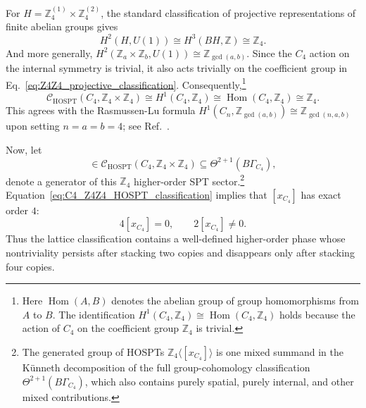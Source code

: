 \documentclass[aps,prx,reprint,superscriptaddress,twocolumn,amsmath,amssymb,amsfonts, nofootinbib]{revtex4-2}
\newcommand{\Z}{\mathbb{Z}}
\theoremstyle{apsstyle}
\begin{document}
\bigskip 

For $H=\mathbb Z_4^{(1)}\times\mathbb Z_4^{(2)}$, the standard classification of projective representations of finite abelian groups gives 
\begin{equation} 
H^{2}(H,U(1)) \cong H^{3}(BH,\mathbb Z) \cong \mathbb Z_4. \label{eq:Z4Z4_projective_classification} \end{equation} 
And more generally, $H^{2}(\mathbb Z_a\times\mathbb Z_b,U(1)) \cong\mathbb Z_{\gcd(a,b)}$. Since the $C_4$ action on the internal symmetry is trivial, it also acts trivially on the coefficient group in Eq.~\eqref{eq:Z4Z4_projective_classification}. Consequently,\footnote{Here $\operatorname{Hom}(A,B)$ denotes the abelian group of group homomorphisms from $A$ to $B$. The identification
$H^{1}(C_4,\mathbb Z_4)\cong\operatorname{Hom}(C_4,\mathbb Z_4)$ holds because the action of $C_4$ on the coefficient group $\mathbb Z_4$ is trivial.} 
\begin{equation} 
\mathcal C_{\mathrm{HOSPT}} \left( C_4,\mathbb Z_4\times\mathbb Z_4 \right) \cong H^{1}(C_4,\mathbb Z_4) \cong \operatorname{Hom}(C_4,\mathbb Z_4) \cong \mathbb Z_4. 
\label{eq:C4_Z4Z4_HOSPT_classification} 
\end{equation} 
This agrees with the Rasmussen-Lu formula $H^{1}(C_n,\mathbb Z_{\gcd(a,b)}) \cong\mathbb Z_{\gcd(n,a,b)}$ upon setting $n=a=b=4$; see Ref.~\cite{Rasmussen2020}.

Now, let
\begin{equation}
[x_{C_{4}}] \in \mathcal C_{\mathrm{HOSPT}}
\left( C_{4}, \mathbb Z_{4}\times\mathbb Z_{4}
\right) \subseteq \Theta^{2+1}(B\Gamma_{C_{4}}),
\label{eq:x_C4}
\end{equation}
denote a generator of this $\mathbb Z_4$ higher-order SPT sector.\footnote{The generated group of HOSPTs $\Z_4\langle [x_{C_{4}}] \rangle$ is one mixed summand in the K\"unneth decomposition of the full group-cohomology classification $\Theta^{2+1}(B\Gamma_{C_4})$, which also contains purely spatial, purely internal, and other mixed contributions.} Equation~\eqref{eq:C4_Z4Z4_HOSPT_classification} implies that $[x_{C_{4}}]$ has exact order $4$:
\begin{equation}
4[x_{C_{4}}]=0, \qquad 2[x_{C_{4}}]\neq0.
\label{eq:C4_HOSPT_order_four}
\end{equation}
Thus the lattice classification contains a well-defined higher-order phase whose nontriviality persists after stacking two copies and disappears only after stacking four copies.

\bigskip
\end{document}
